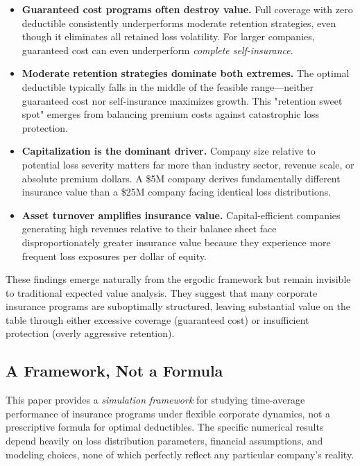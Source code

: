 \documentclass[11pt,letterpaper]{article}
\begin{document}
\begin{itemize}
    \item \textbf{Guaranteed cost programs often destroy value.} Full coverage with zero deductible consistently underperforms moderate retention strategies, even though it eliminates all retained loss volatility. For larger companies, guaranteed cost can even underperform \emph{complete self-insurance}.

    \item \textbf{Moderate retention strategies dominate both extremes.} The optimal deductible typically falls in the middle of the feasible range—neither guaranteed cost nor self-insurance maximizes growth. This "retention sweet spot" emerges from balancing premium costs against catastrophic loss protection.

    \item \textbf{Capitalization is the dominant driver.} Company size relative to potential loss severity matters far more than industry sector, revenue scale, or absolute premium dollars. A \$5M company derives fundamentally different insurance value than a \$25M company facing identical loss distributions.

    \item \textbf{Asset turnover amplifies insurance value.} Capital-efficient companies generating high revenues relative to their balance sheet face disproportionately greater insurance value because they experience more frequent loss exposures per dollar of equity.
\end{itemize}

These findings emerge naturally from the ergodic framework but remain invisible to traditional expected value analysis. They suggest that many corporate insurance programs are suboptimally structured, leaving substantial value on the table through either excessive coverage (guaranteed cost) or insufficient protection (overly aggressive retention).

\subsection{A Framework, Not a Formula}

This paper provides a \emph{simulation framework} for studying time-average performance of insurance programs under flexible corporate dynamics, not a prescriptive formula for optimal deductibles. The specific numerical results depend heavily on loss distribution parameters, financial assumptions, and modeling choices, none of which perfectly reflect any particular company's reality.
\end{document}
